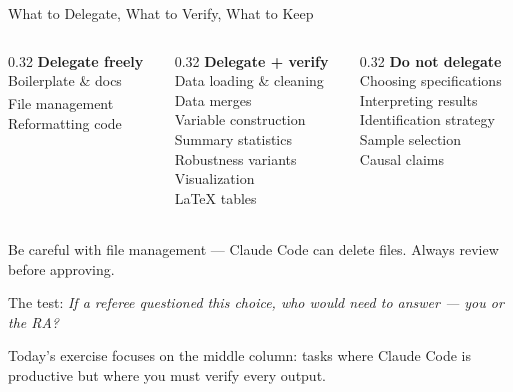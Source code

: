 \begin{frame}{What to Delegate, What to Verify, What to Keep}
  \begin{columns}[T]
    \begin{column}{0.32\textwidth}
      {\color{green!50!black}\textbf{Delegate freely}}\\[0.3em]
      {\small
      Boilerplate \& docs\\
      File management\textsuperscript{\dag}\\
      Reformatting code}
    \end{column}
    \begin{column}{0.32\textwidth}
      {\color{accent}\textbf{Delegate + verify}}\\[0.3em]
      {\small
      Data loading \& cleaning\\
      Data merges\\
      Variable construction\\
      Summary statistics\\
      Robustness variants\\
      Visualization\\
      \LaTeX{} tables}
    \end{column}
    \begin{column}{0.32\textwidth}
      {\color{red!70!black}\textbf{Do not delegate}}\\[0.3em]
      {\small
      Choosing specifications\\
      Interpreting results\\
      Identification strategy\\
      Sample selection\\
      Causal claims}
    \end{column}
  \end{columns}

  \vspace{0.5em}
  {\scriptsize \textsuperscript{\dag} Be careful with file management --- Claude Code can delete files. Always review before approving.}

  \vspace{0.5em}
  The test: \textit{If a referee questioned this choice, who would need to answer --- you or the RA?}

  \vspace{0.5em}
  Today's exercise focuses on the middle column: tasks where Claude Code is productive but where you must verify every output.
\end{frame}


